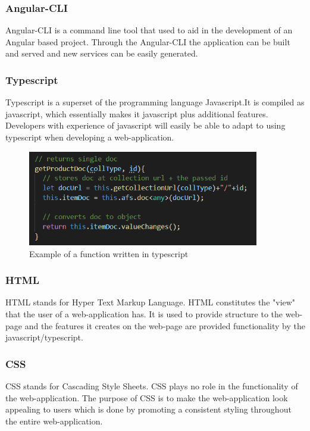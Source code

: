 \subsubsection{Angular-CLI}
Angular-CLI is a command line tool that used to aid in the development of an Angular based project. Through the Angular-CLI the application can be built and served and new services can be easily generated\cite{angcli}.

\subsubsection{Typescript}
Typescript is a superset of the programming language Javascript.It is compiled as javascript, which essentially makes it javascript plus additional features. Developers with experience of javascript will easily be able to adapt to using typescript when developing a web-application\cite{tsdocs}.  

\begin{figure}[h!]
	\caption{Example of a function written in typescript}
	\centering
	\includegraphics[width=0.9\textwidth]{images/tscode.png}
\end{figure}

\subsubsection{HTML}
HTML stands for Hyper Text Markup Language. HTML constitutes the "view" that the user of a web-application has. It is used to provide structure to the web-page and the features it creates on the web-page are provided functionality by the javascript/typescript. 

\subsubsection{CSS}
CSS stands for Cascading Style Sheets. CSS plays no role in the functionality of the web-application. The purpose of CSS is to make the web-application look appealing to users which is done by promoting a consistent styling throughout the entire web-application.

